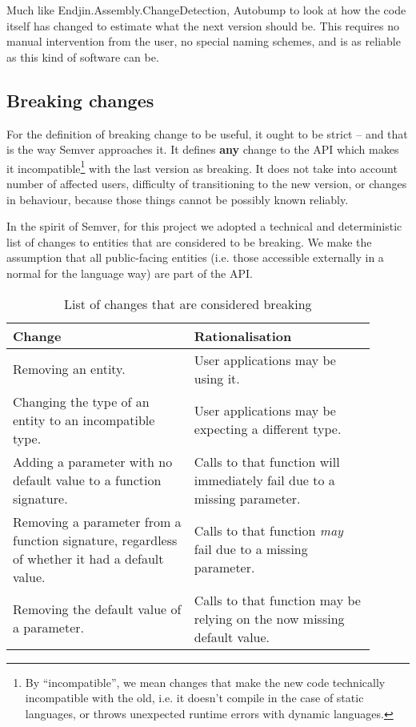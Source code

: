 \documentclass{l4proj}
\begin{document}
Much like Endjin.Assembly.ChangeDetection, Autobump to look at how the
code itself has changed to estimate what the next version should be.
This requires no manual intervention from the user, no special naming
schemes, and is as reliable as this kind of software can be.


\subsection{Breaking changes}
\label{BreakingChanges}

For the definition of breaking change to be useful, it ought to be
strict -- and that is the way Semver approaches it. It defines
\textbf{any} change to the API which makes it incompatible\footnote{By
``incompatible'', we mean changes that make the new code technically
incompatible with the old, i.e. it doesn't compile in the case of
static languages, or throws unexpected runtime errors with dynamic
languages.} with the last version as breaking. It does not take into
account number of affected users, difficulty of transitioning to the
new version, or changes in behaviour, because those things cannot be
possibly known reliably.

In the spirit of Semver, for this project we adopted a technical and
deterministic list of changes to entities that are considered
to be breaking. We make the assumption that all public-facing entities
(i.e. those accessible externally in a normal for the language way)
are part of the API.

\begin{table}[H]
\centering
\begin{tabular}{|p{0.45\linewidth}|p{0.45\linewidth}|}
\hline
\textbf{Change}                                                                               & \textbf{Rationalisation}                                                 \\
\hline
Removing an entity.                                                                           & User applications may be using it.                                       \\
\hline
Changing the type of an entity to an incompatible type.                                       & User applications may be expecting a different type.                     \\
\hline
Adding a parameter with no default value to a function signature.                             & Calls to that function will immediately fail due to a missing parameter. \\
\hline
Removing a parameter from a function signature, regardless of whether it had a default value. & Calls to that function \textit{may} fail due to a missing parameter.     \\
\hline
Removing the default value of a parameter.                                                    & Calls to that function may be relying on the now missing default value.  \\
\hline
\end{tabular}
\caption{List of changes that are considered breaking}
\end{table}
\end{document}
